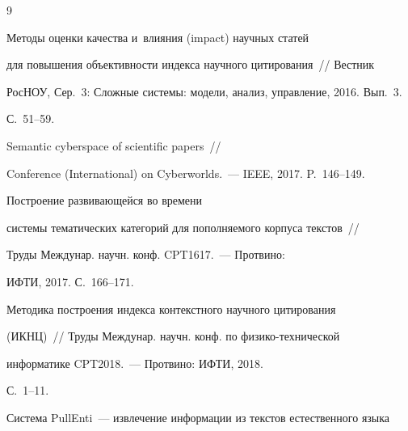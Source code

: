   {\small\frenchspacing


{%




\begin{thebibliography}{9}


  




   Методы оценки качества и~влияния (impact) научных статей 


для повышения объективности индекса научного цитирования~/\!\!/ Вестник 


РосНОУ, Сер.~3: Сложные системы: модели, анализ, управление, 2016. Вып.~3. 


С.~51--59.




   Semantic cyberspace of scientific papers~/\!\!/ 


Conference (International) on Cyberworlds.~--- IEEE, 2017. P.~146--149.




   Построение развивающейся во времени 


системы тематических категорий для пополняемого корпуса текстов~/\!\!/ 


Труды Междунар. научн. конф. CPT1617.~--- Протвино: 


ИФТИ, 2017. С.~166--171.






Методика построения индекса контекстного научного цитирования 


(ИКНЦ)~/\!\!/ Труды Междунар. научн. конф. по фи\-зи\-ко-тех\-ни\-че\-ской 


информатике CPT2018.~--- Протвино: ИФТИ, 2018. 


С.~1--11.









Система PullEnti~--- извлечение информации из текстов естественного языка 



\end{thebibliography}}}

